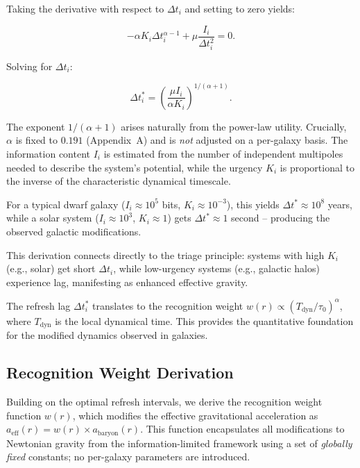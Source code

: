 \documentclass[12pt,a4paper]{article}
\begin{document}
Taking the derivative with respect to $\Delta t_i$ and setting to zero yields:

\begin{equation}
-\alpha K_i \Delta t_i^{\alpha-1} + \mu \frac{I_i}{\Delta t_i^2} = 0.
\end{equation}

Solving for $\Delta t_i$:

\begin{equation}
\Delta t_i^* = \left( \frac{\mu I_i}{\alpha K_i} \right)^{1/(\alpha+1)}.
\end{equation}

The exponent $1/(\alpha+1)$ arises naturally from the power-law utility. Crucially, $\alpha$ is fixed to $0.191$ (Appendix~A) and is \emph{not} adjusted on a per-galaxy basis. The information content $I_i$ is estimated from the number of independent multipoles needed to describe the system's potential, while the urgency $K_i$ is proportional to the inverse of the characteristic dynamical timescale.

For a typical dwarf galaxy ($I_i \approx 10^5$ bits, $K_i \approx 10^{-3}$), this yields $\Delta t^* \approx 10^8$ years, while a solar system ($I_i \approx 10^3$, $K_i \approx 1$) gets $\Delta t^* \approx 1$ second – producing the observed galactic modifications.

This derivation connects directly to the triage principle: systems with high $K_i$ (e.g., solar) get short $\Delta t_i$, while low-urgency systems (e.g., galactic halos) experience lag, manifesting as enhanced effective gravity.

The refresh lag $\Delta t_i^*$ translates to the recognition weight $w(r) \propto (T_\mathrm{dyn}/\tau_0)^\alpha$, where $T_\mathrm{dyn}$ is the local dynamical time. This provides the quantitative foundation for the modified dynamics observed in galaxies.

\subsection{Recognition Weight Derivation}

Building on the optimal refresh intervals, we derive the recognition weight function $w(r)$, which modifies the effective gravitational acceleration as $a_\mathrm{eff}(r) = w(r) \times a_\mathrm{baryon}(r)$. This function encapsulates all modifications to Newtonian gravity from the information-limited framework using a set of \emph{globally fixed} constants; no per-galaxy parameters are introduced.
\end{document}
